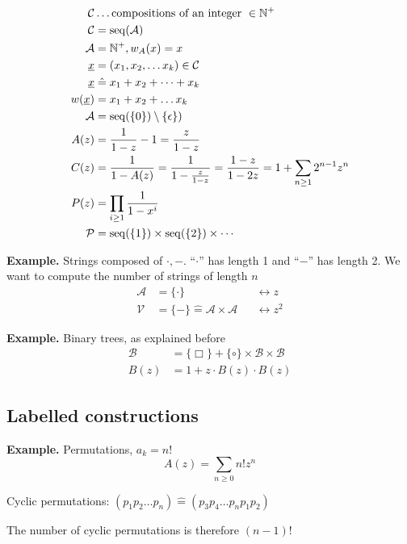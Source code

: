 \begin{align*}
    \mathcal{C} &\ldots \text{compositions of an integer }\in \mathbb{N}^{+} \\
    \mathcal{C} &= \operatorname{seq}(\mathcal{A}) \\
     \mathcal{A} &= \mathbb{N}^{+}, w_A(x) = x\\
	\underline{x} &= (x_1, x_2, \ldots x_k) \in \mathcal{C}\\
    \underline{x} &\mathrel{\hat{=}} x_1 + x_2 + \cdots + x_k\\
    w(\underline{x}) &= x_1 + x_2 + \ldots x_k\\
    \mathcal{A}&=\operatorname{seq}( \{ 0 \})\setminus \{\epsilon\}) \\
    A(z) &= \frac{1}{1-z} - 1 = \frac{z}{1-z} \\
    C(z) &= \frac{1}{1-A(z)} = \frac{1}{1-\frac{z}{1-z} }
         = \frac{1-z}{1-2z}
         = 1 + \sum_{n\geq 1} 2^{n-1} z^n \\
    P(z) &= \prod_{i\geq 1} \frac{1}{1-x^i}\\
	\mathcal{P} &= \operatorname{seq}(\{1\}) \times \operatorname{seq}(\{2\}) \times \cdots \\
\end{align*}

\textbf{Example.}
Strings composed of $\cdot, -$.
“$\cdot$” has length 1 and “$-$” has length 2.
We want to compute the number of strings of length $n$
\begin{align*}
  \mathcal{A} &= \{\cdot\} && \leftrightarrow z\\
  \mathcal{V} &= \{ - \} \mathrel{\hat{=}} \mathcal{A} \times \mathcal{A} && \leftrightarrow z^2
\end{align*}

\textbf{Example.}
Binary trees, as explained before
\begin{align*}
  \mathcal{B} &= \{ \Box\} + \{ \circ\} \times \mathcal{B} \times \mathcal{B}\\
  B(z) &= 1 + z \cdot B(z) \cdot B(z)
\end{align*}

\subsection{Labelled constructions}
\textbf{Example.}
Permutations, $a_k = n!$
\[
  A(z) = \sum_{n\geq 0} n! z^n
\]

Cyclic permutations: $(p_1 p_2 \ldots p_n) \mathrel{\hat{=}} (p_3 p_4 \ldots p_n p_1 p_2)$

The number of cyclic permutations is therefore $(n-1)!$

